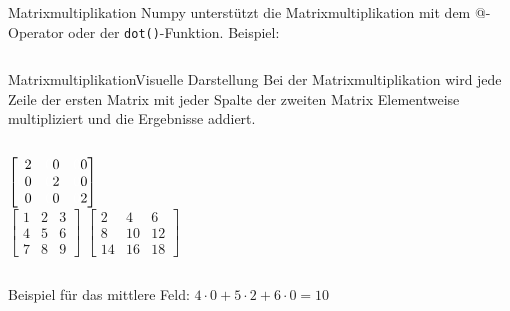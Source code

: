 \documentclass[xelatex,aspectratio=169]{beamer}
\begin{document}
\begin{frame}{Matrixmultiplikation}
    Numpy unterstützt die Matrixmultiplikation mit dem @-Operator oder der \texttt{dot()}-Funktion. Beispiel:
    \inputminted[firstline=3]{python}{src/numpy_arrays_multiply.py}
\end{frame}
\begin{frame}{Matrixmultiplikation}{Visuelle Darstellung}
    Bei der Matrixmultiplikation wird jede Zeile der ersten Matrix mit jeder Spalte der zweiten Matrix Elementweise multipliziert und die Ergebnisse addiert.
    \vspace{0.5cm}
    \begin{columns}
        \begin{column}{0.4\textwidth}
            \begin{center}
                \flushright
                $\begin{bmatrix}
                        \textcolor{white}{0}2 & \textcolor{white}{0}0 & \textcolor{white}{0}0 \\
                        \textcolor{white}{0}0 & \textcolor{white}{0}2 & \textcolor{white}{0}0 \\
                        \textcolor{white}{0}0 & \textcolor{white}{0}0 & \textcolor{white}{0}2
                    \end{bmatrix}$ \\
                $\begin{bmatrix}
                        1 & 2 & 3 \\
                        4 & 5 & 6 \\
                        7 & 8 & 9
                    \end{bmatrix}$
                $\begin{bmatrix}
                        2  & 4  & 6  \\
                        8  & 10 & 12 \\
                        14 & 16 & 18
                    \end{bmatrix}$
            \end{center}
        \end{column}
    \end{columns}
    Beispiel für das mittlere Feld: \(4 \cdot 0 + 5 \cdot 2 + 6 \cdot 0 = 10\)
\end{frame}
\end{document}
